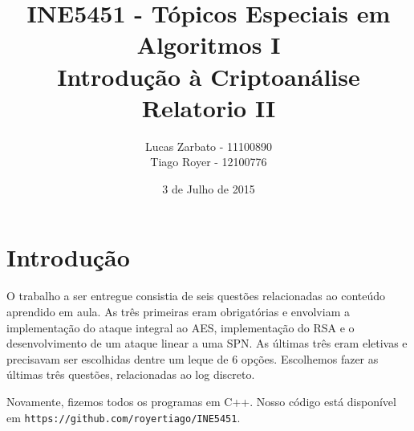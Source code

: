 \documentclass{article}
\title{
    INE5451 - Tópicos Especiais em Algoritmos I \\
    Introdução à Criptoanálise \\
    Relatorio II
}
\author{
    Lucas Zarbato - 11100890\\
    Tiago Royer - 12100776
}
\date{3 de Julho de 2015}
\begin{document}
\maketitle

\section{Introdução}

O trabalho a ser entregue consistia de seis questões
relacionadas ao conteúdo aprendido em aula.
As três primeiras eram obrigatórias
e envolviam a implementação do ataque integral ao AES,
implementação do RSA
e o desenvolvimento de um ataque linear a uma SPN.
As últimas três eram eletivas e precisavam ser escolhidas
dentre um leque de 6 opções.
Escolhemos fazer as últimas três questões, relacionadas ao log discreto.

Novamente, fizemos todos os programas em C++.
Nosso código está disponível em \texttt{https://github.com/royertiago/INE5451}.
\end{document}
